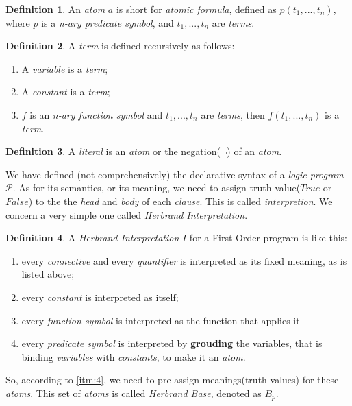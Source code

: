 \documentclass[letterpaper,10pt]{article}
\theoremstyle{definition}
\newtheorem{defn}{Definition}
\begin{document}
\begin{defn}
An \emph{atom} $a$ is short for \emph{atomic formula}, defined as $p(t_1,..., t_n)$, where $p$ is a \emph{n-ary predicate symbol}, and $t_1,...,t_n$ are \emph{terms}.
\end{defn}

\begin{defn}
A \emph{term} is defined recursively as follows:
\begin{enumerate}[label=(\alph*), noitemsep]
\item A \emph{variable} is a \emph{term};
\item A \emph{constant} is a \emph{term};
\item $f$ is an \emph{n-ary function symbol} and $t_1,...,t_n$ are \emph{terms}, then $f(t_1,...,t_n)$ is a \emph{term}.
\end{enumerate}
\end{defn}

\begin{defn}
A \emph{literal} is an \emph{atom} or the negation($\neg$) of an \emph{atom}.
\end{defn}

We have defined (not comprehensively) the declarative syntax of a \emph{logic program} $\mathcal{P}$. As for its semantics, or its meaning, we need to assign truth value($True$ or $False$) to the the \emph{head} and \emph{body} of each \emph{clause}. This is called \emph{interpretion}. We concern a very simple one called \emph{Herbrand Interpretation}.


\begin{defn}
A \emph{Herbrand Interpretation} $I$ for a First-Order program is like this:
\begin{enumerate}[label=(\alph*), noitemsep]
\item every \emph{connective} and every \emph{quantifier} is interpreted as its fixed meaning, as is listed above;
\item every \emph{constant} is interpreted as itself;
\item every \emph{function symbol} is interpreted as the function that applies it
\item every \emph{predicate symbol} is interpreted by \textbf{grouding} the variables, that is binding \emph{variables} with \emph{constants}, to make it an \emph{atom}.\label{itm:4}
\end{enumerate}
\end{defn}

So, according to \ref{itm:4}, we need to pre-assign meanings(truth values) for these \emph{atoms}. This set of \emph{atoms} is called \emph{Herbrand Base}, denoted as $B_p$.
\end{document}
